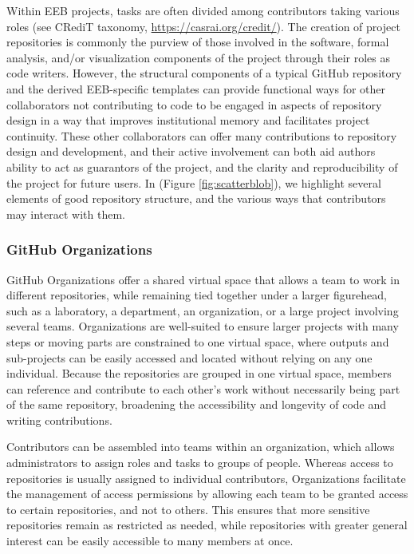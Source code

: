 Within EEB projects, tasks are often divided among contributors taking various roles (see CRediT taxonomy, \url{https://casrai.org/credit/}).
The creation of project repositories is commonly the purview of those involved in the software, formal analysis, and/or visualization components of the project through their roles as code writers.
However, the structural components of a typical GitHub repository and the derived EEB-specific templates can provide functional ways for other collaborators not contributing to code to be engaged in aspects of repository design in a way that improves institutional memory and facilitates project continuity.
These other collaborators can offer many contributions to repository design and development, and their active involvement can both aid authors ability to act as guarantors of the project, and the clarity and reproducibility of the project for future users.
In (Figure \ref{fig:scatterblob}), we highlight several elements of good repository structure, and the various ways that contributors may interact with them.

\hypertarget{github-organizations}{%
\subsubsection{GitHub Organizations}\label{github-organizations}}

GitHub Organizations offer a shared virtual space that allows a team to work in different repositories, while remaining tied together under a larger figurehead, such as a laboratory, a department, an organization, or a large project involving several teams.
Organizations are well-suited to ensure larger projects with many steps or moving parts are constrained to one virtual space, where outputs and sub-projects can be easily accessed and located without relying on any one individual.
Because the repositories are grouped in one virtual space, members can reference and contribute to each other's work without necessarily being part of the same repository, broadening the accessibility and longevity of code and writing contributions.

Contributors can be assembled into teams within an organization, which allows administrators to assign roles and tasks to groups of people.
Whereas access to repositories is usually assigned to individual contributors, Organizations facilitate the management of access permissions by allowing each team to be granted access to certain repositories, and not to others.
This ensures that more sensitive repositories remain as restricted as needed, while repositories with greater general interest can be easily accessible to many members at once.


